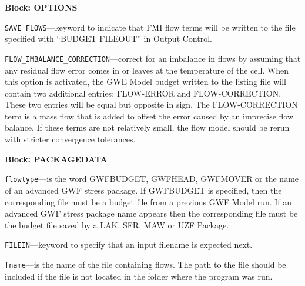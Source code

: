 
\item \textbf{Block: OPTIONS}

\begin{description}
\item \texttt{SAVE\_FLOWS}---keyword to indicate that FMI flow terms will be written to the file specified with ``BUDGET FILEOUT'' in Output Control.

\item \texttt{FLOW\_IMBALANCE\_CORRECTION}---correct for an imbalance in flows by assuming that any residual flow error comes in or leaves at the temperature of the cell.  When this option is activated, the GWE Model budget written to the listing file will contain two additional entries: FLOW-ERROR and FLOW-CORRECTION.  These two entries will be equal but opposite in sign.  The FLOW-CORRECTION term is a mass flow that is added to offset the error caused by an imprecise flow balance.  If these terms are not relatively small, the flow model should be rerun with stricter convergence tolerances.

\end{description}
\item \textbf{Block: PACKAGEDATA}

\begin{description}
\item \texttt{flowtype}---is the word GWFBUDGET, GWFHEAD, GWFMOVER or the name of an advanced GWF stress package.  If GWFBUDGET is specified, then the corresponding file must be a budget file from a previous GWF Model run.  If an advanced GWF stress package name appears then the corresponding file must be the budget file saved by a LAK, SFR, MAW or UZF Package.

\item \texttt{FILEIN}---keyword to specify that an input filename is expected next.

\item \texttt{fname}---is the name of the file containing flows.  The path to the file should be included if the file is not located in the folder where the program was run.

\end{description}

